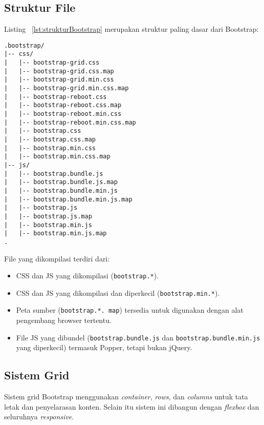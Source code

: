 \subsection{Struktur File}
Listing ~\ref{lst:strukturBootstrap} merupakan struktur paling dasar dari Bootstrap:
\begin{lstlisting}[basicstyle=\ttfamily, frame=single,
columns=fullflexible, keepspaces=true, breaklines=true, label={lst:strukturBootstrap}, caption=Struktur file pada bootstrap 4]
.bootstrap/
|-- css/
|   |-- bootstrap-grid.css 
|   |-- bootstrap-grid.css.map 
|   |-- bootstrap-grid.min.css
|   |-- bootstrap-grid.min.css.map
|   |-- bootstrap-reboot.css
|   |-- bootstrap-reboot.css.map
|   |-- bootstrap-reboot.min.css
|   |-- bootstrap-reboot.min.css.map
|   |-- bootstrap.css
|   |-- bootstrap.css.map
|   |-- bootstrap.min.css
|   |-- bootstrap.min.css.map
|-- js/
|   |-- bootstrap.bundle.js
|   |-- bootstrap.bundle.js.map
|   |-- bootstrap.bundle.min.js
|   |-- bootstrap.bundle.min.js.map
|   |-- bootstrap.js
|   |-- bootstrap.js.map
|   |-- bootstrap.min.js
|   |-- bootstrap.min.js.map
.
\end{lstlisting}

File yang dikompilasi terdiri dari: 
\begin{itemize}
	\item CSS dan JS yang dikompilasi (\texttt{bootstrap.*}).
	\item CSS dan JS yang dikompilasi dan diperkecil (\texttt{bootstrap.min.*}). \item Peta sumber (\texttt{bootstrap.*. map}) tersedia untuk digunakan dengan alat pengembang browser tertentu. 
	\item File JS yang dibundel (\texttt{bootstrap.bundle.js} dan \texttt{bootstrap.bundle.min.js} yang diperkecil) termasuk Popper, tetapi bukan jQuery.
\end{itemize}

\subsection{Sistem Grid}
Sistem grid Bootstrap menggunakan \textit{container}, \textit{rows}, dan \textit{columns} untuk tata letak dan penyelarasan konten. Selain itu sistem ini dibangun dengan \textit{flexbox} dan seluruhnya \textit{responsive}. \\ \\

